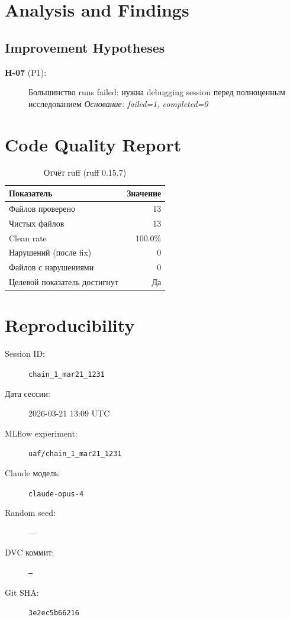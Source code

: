 \documentclass[12pt,a4paper]{article}
\begin{document}
\section{Analysis and Findings}





\subsection{Improvement Hypotheses}

\begin{description}
    \item[\textbf{H-07} (P1):] Большинство runs failed: нужна debugging session перед полноценным исследованием
    \textit{Основание: failed=1, completed=0}
\end{description}




\section{Code Quality Report}

\begin{table}[H]
\centering
\caption{Отчёт ruff (ruff 0.15.7)}
\begin{tabular}{lr}
\toprule
Показатель & Значение \\
\midrule
Файлов проверено & 13 \\
Чистых файлов & 13 \\
Clean rate & \textcolor{passcolor}{100.0\%} \\
Нарушений (после fix) & \textcolor{passcolor}{0} \\
Файлов с нарушениями & 0 \\
Целевой показатель достигнут & \textcolor{passcolor}{Да} \\
\bottomrule
\end{tabular}
\end{table}





\section{Reproducibility}

\begin{description}
    \item[Session ID:] \texttt{chain\_1\_mar21\_1231}
    \item[Дата сессии:] 2026-03-21 13:09 UTC
    \item[MLflow experiment:] \texttt{uaf/chain\_1\_mar21\_1231}
    \item[Claude модель:] \texttt{claude-opus-4}
    \item[Random seed:] ---
    \item[DVC коммит:] \texttt{---}
    \item[Git SHA:] \texttt{3e2ec5b66216}
\end{description}
\end{document}
